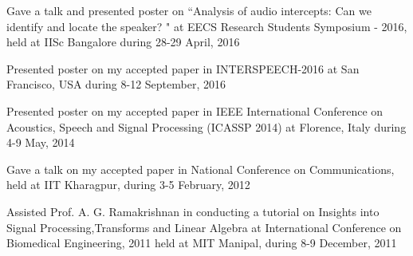 \documentclass[line]{resume}
\begin{document}
{\begin{resume}
\begin{list2}
			\item Gave a talk and presented poster on ``Analysis of audio intercepts: Can we identify and locate the speaker? " at EECS Research Students Symposium - 2016,  held at IISc Bangalore during 28-29 April, 2016
			
			
			\item 
			Presented poster on my accepted paper in INTERSPEECH-2016 at San Francisco, USA during 8-12 September, 2016
			
			
			\item Presented poster on my accepted paper in IEEE International Conference on Acoustics, Speech and Signal Processing (ICASSP 2014) at Florence, Italy  during  4-9 May, 2014
			
			\item 
			
			Gave a talk on my accepted paper in  National Conference on Communications,  held at IIT Kharagpur, during 3-5 February, 2012
			
			\item Assisted Prof. A. G. Ramakrishnan in conducting a tutorial on Insights into Signal Processing,Transforms and Linear Algebra at International Conference on Biomedical Engineering, 2011 held at MIT Manipal, during 8-9 December, 2011
			
			
			
			
			
			
			\end{list2}
			
	
	\vspace{-1.5mm}
			\vspace{-3.5mm}

\end{resume}}
\end{document}
